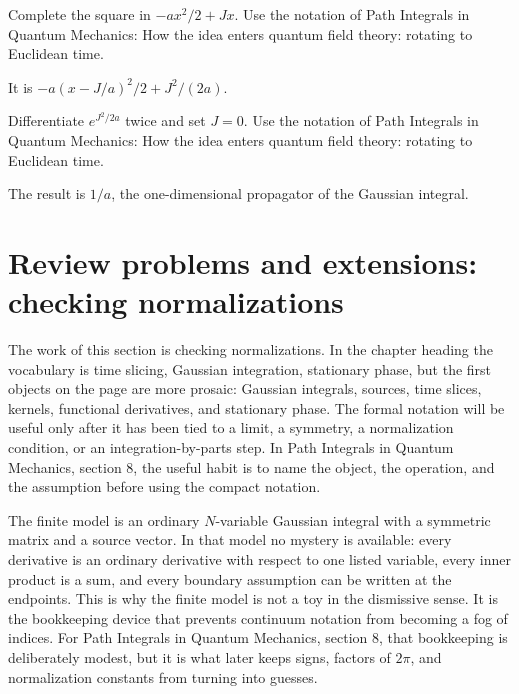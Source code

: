 \begin{exercise}
Complete the square in \(-ax^2/2+Jx\).  Use the notation of Path Integrals in Quantum Mechanics: How the idea enters quantum field theory: rotating to Euclidean time.
\begin{answer}
It is \(-a(x-J/a)^2/2+J^2/(2a)\).
\end{answer}
\end{exercise}

\begin{exercise}
Differentiate \(e^{J^2/2a}\) twice and set \(J=0\).  Use the notation of Path Integrals in Quantum Mechanics: How the idea enters quantum field theory: rotating to Euclidean time.
\begin{answer}
The result is \(1/a\), the one-dimensional propagator of the Gaussian integral.
\end{answer}
\end{exercise}



\section{Review problems and extensions: checking normalizations}

The work of this section is checking normalizations.  In the chapter heading the vocabulary is time slicing, Gaussian integration, stationary phase, but the first objects on the page are more prosaic: Gaussian integrals, sources, time slices, kernels, functional derivatives, and stationary phase.  The formal notation will be useful only after it has been tied to a limit, a symmetry, a normalization condition, or an integration-by-parts step.  In Path Integrals in Quantum Mechanics, section 8, the useful habit is to name the object, the operation, and the assumption before using the compact notation.

The finite model is an ordinary \(N\)-variable Gaussian integral with a symmetric matrix and a source vector.  In that model no mystery is available: every derivative is an ordinary derivative with respect to one listed variable, every inner product is a sum, and every boundary assumption can be written at the endpoints.  This is why the finite model is not a toy in the dismissive sense.  It is the bookkeeping device that prevents continuum notation from becoming a fog of indices.  For Path Integrals in Quantum Mechanics, section 8, that bookkeeping is deliberately modest, but it is what later keeps signs, factors of \(2\pi\), and normalization constants from turning into guesses.

